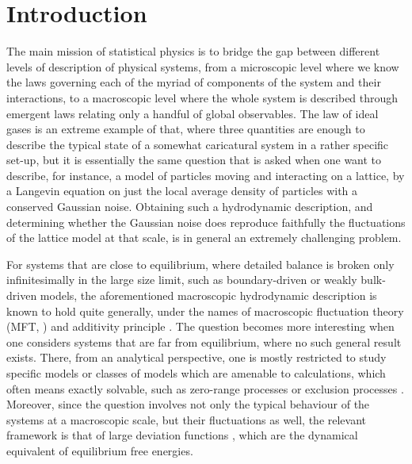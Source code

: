 \documentclass[aps,pre,onecolumn,showpacs,showkeys,a4paper]{revtex4-1}
\begin{document}
\maketitle

\tableofcontents

\newpage

\section{Introduction}
\label{I}

The main mission of statistical physics is to bridge the gap between different levels of description of physical systems, from a microscopic level where we know the laws governing each of the myriad of components of the system and their interactions, to a macroscopic level where the whole system is described through emergent laws relating only a handful of global observables. The law of ideal gases is an extreme example of that, where three quantities are enough to describe the typical state of a somewhat caricatural system in a rather specific set-up, but it is essentially the same question that is asked when one want to describe, for instance, a model of particles moving and interacting on a lattice, by a Langevin equation on just the local average density of particles with a conserved Gaussian noise. Obtaining such a hydrodynamic description, and determining whether the Gaussian noise does reproduce faithfully the fluctuations of the lattice model at that scale, is in general an extremely challenging problem.

For systems that are close to equilibrium, where detailed balance is broken only infinitesimally in the large size limit, such as boundary-driven or weakly bulk-driven models, the aforementioned macroscopic hydrodynamic description is known to hold quite generally, under the names of macroscopic fluctuation theory (MFT, \cite{Bertini2007}) and additivity principle \cite{PhysRevLett.92.180601}. The question becomes more interesting when one considers systems that are far from equilibrium, where no such general result exists. There, from an analytical perspective, one is mostly restricted to study specific models or classes of models which are amenable to calculations, which often means exactly solvable, such as zero-range processes \cite{Harris2005,Chleboun2016} or exclusion processes \cite{Derrida199865,0034-4885-74-11-116601}. Moreover, since the question involves not only the typical behaviour of the systems at a macroscopic scale, but their fluctuations as well, the relevant framework is that of large deviation functions \cite{Touchette20091}, which are the dynamical equivalent of equilibrium free energies.
\end{document}
